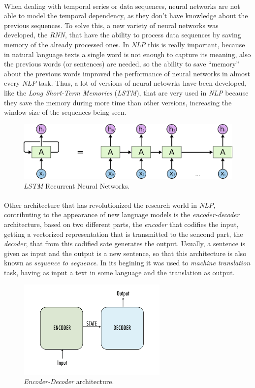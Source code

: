 \paragraph{}
When dealing with temporal series or data sequences, neural networks are not able to model the temporal dependency, as they don't have knowledge about the previous sequences. To solve this, a new variety of neural networks was developed, the \emph{RNN}, that have the ability to process data sequences by saving memory of the already processed ones. In \emph{NLP} this is really important, because in natural language texts a single word is not enough to capture its meaning, also the previous words (or sentences) are needed, so the ability to save ``memory'' about the previous words improved the performance of neural networks in almost every \emph{NLP} task. Thus, a lot of versions of neural netowrks have been developed, like the \emph{Long Short-Term Memories} (\emph{LSTM}), that are very used in \emph{NLP} because they save the memory during more time than other versions, increasing the window size of the sequences being seen.
\begin{figure}[!h]
	\centering
	\includegraphics[scale=0.55]{images/lstm}
	\caption{\emph{LSTM} Recurrent Neural Networks.}
	\label{fig:lstm}
\end{figure}
\paragraph{}
Other architecture that has revolutionized the research world in \emph{NLP}, contributing to the appearance of new language models is the \emph{encoder-decoder} architecture, based on two different parts, the \emph{encoder} that codifies the input, getting a vectorized representation that is transmitted to the sencond part, the \emph{decoder}, that from this codified sate generates the output. Usually, a sentence is given as input and the output is a new sentence, so that this architecture is also known as \emph{sequence to sequence}. In its begining it was used to \emph{machine translation} task, having as input a text in some language and the translation as output.
\begin{figure}[h!]
	\centering
	\includegraphics[scale=0.75]{images/encoderdecoder}
	\caption{\emph{Encoder-Decoder} architecture.}
	\label{fig:encoderdecoder}
\end{figure}
